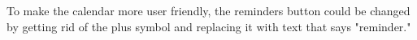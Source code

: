 To make the calendar more user friendly, the reminders button could be changed by getting rid of the plus symbol and replacing it with text that says "reminder." 